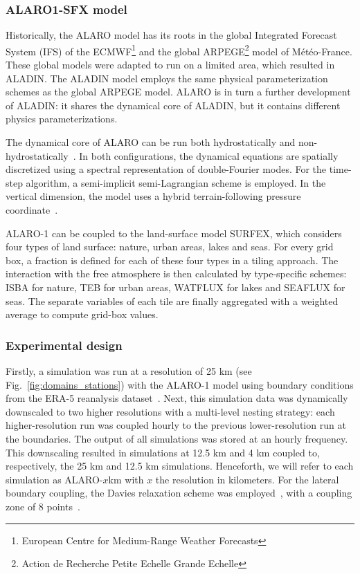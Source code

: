 \documentclass[journal abbreviation, manuscript]{copernicus}
\begin{document}
\subsubsection{ALARO1-SFX model}

Historically, the ALARO model has its roots in the global Integrated Forecast System (IFS) of the ECMWF\footnote{European Centre for Medium-Range Weather Forecasts} and the global ARPEGE\footnote{Action de Recherche Petite Echelle Grande Echelle} model of Météo-France.
These global models were adapted to run on a limited area, which resulted in ALADIN.
The ALADIN model employs the same physical parameterization schemes as the global ARPEGE model.
ALARO is in turn a further development of ALADIN: it  shares the dynamical core of ALADIN, but it contains different physics parameterizations.

The dynamical core of ALARO 
can be run both hydrostatically and non-hydrostatically~\citep{bubnova_integration_1995, termonia_aladin_2018}. 
In both configurations, the dynamical equations are spatially discretized using a spectral representation of double-Fourier modes.
For the time-step algorithm, a semi-implicit semi-Lagrangian scheme is employed. 
In the vertical dimension, the model uses a hybrid terrain-following pressure coordinate~\citep{simmons_energy_1981, laprise_euler_1992}. 

ALARO-1 can be coupled to the land-surface model SURFEX, which considers four types of land surface: nature, urban areas, lakes and seas.
For every grid box, a fraction is defined for each of these four types in a tiling approach.
The interaction with the free atmosphere is then calculated by type-specific schemes: ISBA for nature, TEB for urban areas, WATFLUX for lakes and SEAFLUX for seas.
The separate variables of each tile are finally aggregated with a weighted average to compute grid-box values.

\subsubsection{Experimental design}

Firstly, a simulation was run at a resolution of 25 km (see Fig.~\ref{fig:domains_stations}) with the ALARO-1 model using boundary conditions from the ERA-5 reanalysis dataset~\citep{hersbach_era5_2020}. 
Next, this simulation data was dynamically downscaled to two higher resolutions with a multi-level nesting strategy: each higher-resolution run was coupled hourly to the previous lower-resolution run at the boundaries.
The output of all simulations was stored at an hourly frequency.
This downscaling resulted in simulations at 12.5 km and 4 km coupled to, respectively, the 25 km and 12.5 km simulations. 
Henceforth, we will refer to each simulation as ALARO-$x$km with $x$ the resolution in kilometers. 
For the lateral boundary coupling, the Davies relaxation scheme was employed~\citep{davies_lateral_1976}, with a coupling zone of 8 points~\citep{termonia_aladin_2018}.
\end{document}
